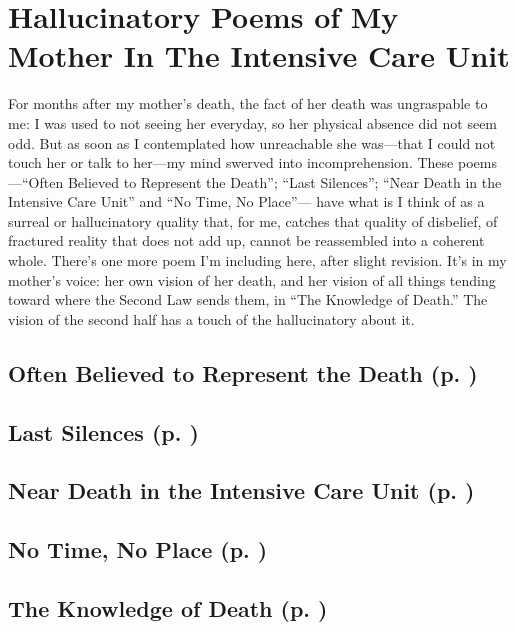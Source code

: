 \section*{Hallucinatory Poems of My Mother In The Intensive Care Unit}

For months after my mother's death, the fact of her death was ungraspable to me:
I was used to not seeing her everyday, so her physical absence did not seem odd.
But as soon as I contemplated how unreachable she was---that I could not touch
her or talk to her---my mind swerved into incomprehension. These poems---``Often
Believed to Represent the Death''; ``Last Silences''; ``Near Death in the
Intensive Care Unit'' and ``No Time, No Place''--- have what is I think of as a
surreal or hallucinatory quality that, for me, catches that quality of
disbelief, of fractured reality that does not add up, cannot be reassembled into
a coherent whole. There's one more poem I'm including here, after slight
revision. It's in my mother's voice: her own vision of her death, and her vision
of all things tending toward where the Second Law sends them, in ``The Knowledge
of Death.'' The vision of the second half has a touch of the hallucinatory about
it.

\subsection*{Often Believed to Represent the Death (p. \pageref{ch:oftenbelieved})}
\subsection*{Last Silences  (p. \pageref{ch:lastsilences})}
\subsection*{Near Death in the Intensive Care Unit (p. \pageref{ch:neardeath})}
\subsection*{No Time, No Place (p. \pageref{ch:notime})}
\subsection*{The Knowledge of Death (p. \pageref{ch:theknowledge})}